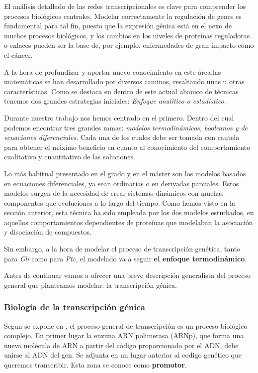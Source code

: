  El análisis detallado de las redes transcripcionales es clave para comprender los procesos biológicos centrales. Modelar correctamente la regulación de genes es fundamental para tal fin, puesto que la expresión génica está en el nexo de muchos procesos biológicos, y los cambios en los niveles de proteínas reguladoras o enlaces pueden ser la base de, por ejemplo, enfermedades de gran impacto como el cáncer. 
 
  A la hora de profundizar y aportar nuevo conocimiento en este área,las matemáticas se han desarrollado por diversos caminos, resaltando unas u otras características. Como se destaca en \cite{ay2011mathematical} dentro de este actual abanico de técnicas tenemos dos grandes estrategias iniciales: \textit{Enfoque analítico o estadístico}. 
  
  Durante nuestro trabajo nos hemos centrado en el primero. Dentro del cual podemos encontrar tres grandes ramas: \textit{modelos termodinámicos, booleanos y de ecuaciones diferenciales}. Cada una de los cuales debe ser tomada con cautela para obtener el máximo beneficio en cuanto al conocimiento del comportamiento cualitativo y cuantitativo de las soluciones. 
 
 Lo más habitual presentado en el grado y en el máster son los modelos basados en ecuaciones diferenciales, ya sean ordinarias o en derivadas parciales. Estos modelos surgen de la necesidad de crear sistemas dinámicos con muchas componentes que evoluciones a lo largo del tiempo. Como hemos visto en la sección anterior, esta técnica ha sido empleada por los dos modelos estudiados, en aquellos comportamientos dependientes de proteínas que modelaban la asociación y disociación de compuestos.
 
 Sin embargo, a la hora de modelar el proceso de transcripción genética, tanto para \textit{Gli} como para \textit{Ptc}, el modelado va a seguir \textbf{el enfoque termodinámico}. 
 
 Antes de continuar vamos a ofrecer una breve descripción generalista del proceso general que planteamos modelar: la transcripción génica.
 
 \subsubsection{Biología de la transcripción génica}
 Segun se expone en \cite{biologia}, el proceso general de transcripción es un proceso biológico complejo. En primer lugar la enzima ARN polimerasa (ARNp), que forma una nueva molécula de ARN a partir del código proporcionado por el ADN, debe unirse al ADN del gen. Se adjunta en un lugar anterior al codigo genético que queremos transcribir. Esta zona se conoce como \textbf{promotor}.
 
